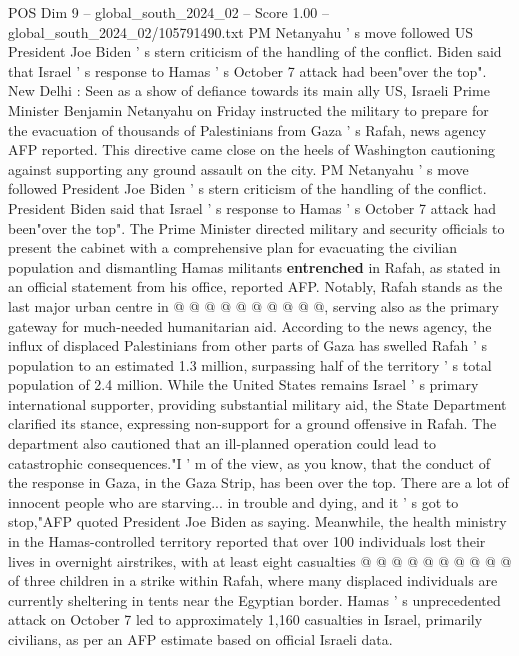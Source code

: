 \begin{textsample}{POS Dim 9 – global\_south\_2024\_02 – Score 1.00 – global\_south\_2024\_02/105791490.txt}  \label{ex:f9_pos_101}
PM Netanyahu ' s move followed US President Joe Biden ' s stern criticism of the handling of the conflict.
Biden said that Israel ' s response to Hamas ' s October 7 attack had been"over the top".
New Delhi : Seen as a show of defiance towards its main ally US, Israeli Prime Minister Benjamin Netanyahu on Friday instructed the military to prepare for the evacuation of thousands of Palestinians from Gaza ' s Rafah, news agency AFP reported.
This directive came close on the heels of Washington cautioning against supporting any ground assault on the city.
PM Netanyahu ' s move followed President Joe Biden ' s stern criticism of the handling of the conflict.
President Biden said that Israel ' s response to Hamas ' s October 7 attack had been"over the top".
The Prime Minister directed military and security officials to present the cabinet with a comprehensive plan for evacuating the civilian population and dismantling Hamas militants \textbf{entrenched} in Rafah, as stated in an official statement from his office, reported AFP.
Notably, Rafah stands as the last major urban centre in @ @ @ @ @ @ @ @ @ @, serving also as the primary gateway for much-needed humanitarian aid.
According to the news agency, the influx of displaced Palestinians from other parts of Gaza has swelled Rafah ' s population to an estimated 1.3 million, surpassing half of the territory ' s total population of 2.4 million.
While the United States remains Israel ' s primary international supporter, providing substantial military aid, the State Department clarified its stance, expressing non-support for a ground offensive in Rafah.
The department also cautioned that an ill-planned operation could lead to catastrophic consequences."I ' m of the view, as you know, that the conduct of the response in Gaza, in the Gaza Strip, has been over the top.
There are a lot of innocent people who are starving... in trouble and dying, and it ' s got to stop,"AFP quoted President Joe Biden as saying.
Meanwhile, the health ministry in the Hamas-controlled territory reported that over 100 individuals lost their lives in overnight airstrikes, with at least eight casualties @ @ @ @ @ @ @ @ @ @ of three children in a strike within Rafah, where many displaced individuals are currently sheltering in tents near the Egyptian border.
Hamas ' s unprecedented attack on October 7 led to approximately 1,160 casualties in Israel, primarily civilians, as per an AFP estimate based on official Israeli data.

\end{textsample}
